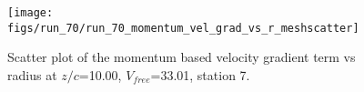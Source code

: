 \begin{figure}[H]
\centering
\texttt{[image: figs/run\_70/run\_70\_momentum\_vel\_grad\_vs\_r\_meshscatter]}
\caption{Scatter plot of the momentum based velocity gradient term vs radius at $z/c$=10.00, $V_{free}$=33.01, station 7.}
\label{fig:run_70_momentum_vel_grad_vs_r_meshscatter}
\end{figure}


